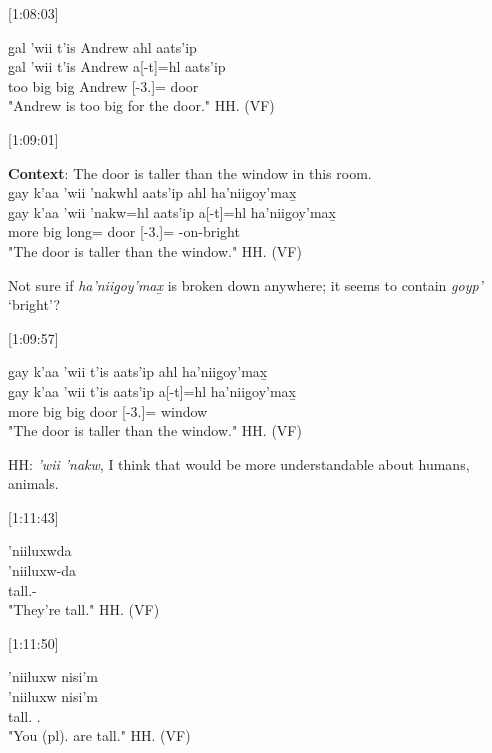 [1:08:03]
\begin{exe}
    \ex \glll
    g̱al 'wii t'is Andrew ahl aats'ip \\
    g̱al 'wii t'is Andrew a[-t]=hl aats'ip \\
    too big big Andrew \Prep{}[-3.\Ii]=\Cn{} door \\
    \glt "Andrew is too big for the door." \hfill HH.\ElicitationDate{} (VF)
\end{exe}

[1:09:01]
\begin{exe}
    \ex \textbf{Context}: The door is taller than the window in this room. \\
    \glll
    g̱ay k'aa 'wii 'nakwhl aats'ip ahl ha'niig̱oy'max̱ \\
    g̱ay k'aa 'wii 'nakw=hl aats'ip a[-t]=hl ha'niig̱oy'max̱ \\
    \Cntr{} more big long=\Cn{} door \Prep{}[-3.\Ii]=\Cn{} \Ins-on-bright \\
    \glt "The door is taller than the window." \hfill HH.\ElicitationDate{} (VF)
\end{exe}

Not sure if \textit{ha'niig̱oy'max̱} is broken down anywhere; it seems to contain \textit{goyp'} `bright'?

[1:09:57]
\begin{exe}
    \ex \glll
    g̱ay k'aa 'wii t'is aats'ip ahl ha'niig̱oy'max̱ \\
    g̱ay k'aa 'wii t'is aats'ip a[-t]=hl ha'niig̱oy'max̱ \\
    \Cntr{} more big big door \Prep{}[-3.\Ii]=\Cn{} window \\  
    \glt "The door is taller than the window." \hfill HH.\ElicitationDate{} (VF)
\end{exe}

HH: \textit{'wii 'nakw}, I think that would be more understandable about humans, animals.

[1:11:43]
\begin{exe}
    \ex \glll
    ’niiluxwda \\
    ’niiluxw-da \\
    tall.\Pl-\Tpl \\
    \glt "They're tall." \hfill HH.\ElicitationDate{} (VF)
\end{exe}

[1:11:50]
\begin{exe}
    \ex \glll
    ’niiluxw nisi'm \\
    ’niiluxw nisi'm \\
    tall.\Pl{} \Spl.\Iii \\
    \glt "You (pl). are tall." \hfill HH.\ElicitationDate{} (VF)
\end{exe}


